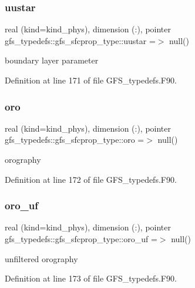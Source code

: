 \subsubsection{uustar}
{\footnotesize\ttfamily real (kind=kind\+\_\+phys), dimension (\+:), pointer gfs\+\_\+typedefs\+::gfs\+\_\+sfcprop\+\_\+type\+::uustar =$>$ null()}



boundary layer parameter 



Definition at line 171 of file G\+F\+S\+\_\+typedefs.\+F90.

\mbox{\label{structgfs__typedefs_1_1gfs__sfcprop__type_a0c783fa972143605d25d1ebe4c63739e}} 
\subsubsection{oro}
{\footnotesize\ttfamily real (kind=kind\+\_\+phys), dimension    (\+:), pointer gfs\+\_\+typedefs\+::gfs\+\_\+sfcprop\+\_\+type\+::oro =$>$ null()}



orography 



Definition at line 172 of file G\+F\+S\+\_\+typedefs.\+F90.

\mbox{\label{structgfs__typedefs_1_1gfs__sfcprop__type_aae59bb333a5ee9e4b36a7859da52b6b9}} 
\subsubsection{oro\+\_\+uf}
{\footnotesize\ttfamily real (kind=kind\+\_\+phys), dimension (\+:), pointer gfs\+\_\+typedefs\+::gfs\+\_\+sfcprop\+\_\+type\+::oro\+\_\+uf =$>$ null()}



unfiltered orography 



Definition at line 173 of file G\+F\+S\+\_\+typedefs.\+F90.

\mbox{\label{structgfs__typedefs_1_1gfs__sfcprop__type_a6f4ffbdb608af2171308228722fbf38b}} 
